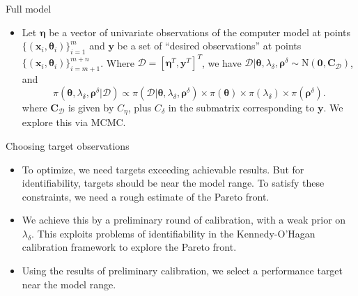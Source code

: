 \documentclass[final]{beamer}
\newlength{\onecolwid}
\begin{document}
\begin{frame}[t]
\begin{columns}[t]
\begin{column}{\onecolwid}
\begin{alertblock}{Full model}
\begin{itemize}
We use the MLEs of $\lambda_\eta$ and $\boldsymbol\rho^\eta$, set $\rho_i^\delta\sim\mathrm{Beta}(1,0.3)$ for all $i$, and set an informative Gamma prior on $\lambda_\delta$ based on what is known \textit{a priori} about the system optimum.

\item Let $\boldsymbol\eta$ be a vector of univariate observations of the computer model at points $\{(\mathbf x_i,\boldsymbol\theta_i)\}_{i=1}^m$ and $\mathbf y$ be a set of ``desired observations'' at points $\{(\mathbf x_i,\boldsymbol\theta_i)\}_{i=m+1}^{m+n}$. Where $\mathcal D=[\boldsymbol\eta^T,\mathbf y^T]^T$, we have $\mathcal D|\boldsymbol \theta,\lambda_\delta,\boldsymbol\rho^\delta\sim\mathrm N(\mathbf0,\mathbf C_{\mathcal D})$, and 
\[
\pi(\boldsymbol\theta,\lambda_\delta,\boldsymbol\rho^\delta|\mathcal D) \propto
\pi(\mathcal D|\boldsymbol\theta,\lambda_\delta,\boldsymbol\rho^\delta)\times
\pi(\boldsymbol\theta) \times
\pi(\lambda_\delta) \times
\pi(\boldsymbol\rho^\delta).
\]
where $\mathbf C_{\mathcal D}$ is given by $C_\eta$, plus $C_\delta$ in the submatrix corresponding to $\mathbf y$. We explore this via MCMC.

\end{itemize}

\end{alertblock} 



\begin{alertblock}{Choosing target observations}

\begin{itemize}
\item To optimize, we need targets exceeding achievable results. But for identifiability, targets should be near the model range. To satisfy these constraints,\! we need a rough estimate of the Pareto front.

\item We achieve this by a preliminary round of calibration, with a weak prior on $\lambda_\delta$. This exploits problems of identifiability in the Kennedy-O'Hagan calibration framework\cite{Kennedy2001} to explore the Pareto front.

\item Using the results of preliminary calibration, we select a performance target near the model range.

\end{itemize}


\end{alertblock}
\end{column}
\end{columns}
\end{frame}
\end{document}
